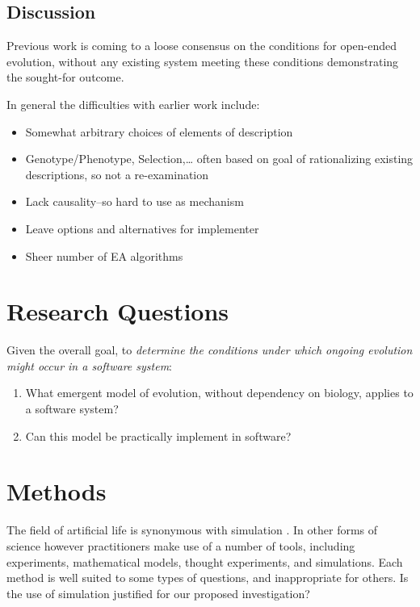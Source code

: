 \subsection{Discussion}

Previous work is coming to a loose consensus on the conditions for open-ended evolution, without any existing system meeting these conditions demonstrating the sought-for outcome.

In general the difficulties with earlier work include:
\begin{itemize}
	\item Somewhat arbitrary choices of elements of description
	\item Genotype/Phenotype, Selection,\ldots{} often based on goal of rationalizing existing descriptions, so not a re-examination
	\item Lack causality--so hard to use as mechanism
	\item Leave options and alternatives for implementer
	\item Sheer number of EA algorithms
\end{itemize}


\section{Research Questions}

Given the overall goal, to \emph{determine the conditions under which ongoing evolution might occur in a software system}:

\vspace{0.3cm}
\begin{minipage}[l]{0.95\textwidth}
	\begin{enumerate}[label=RQ\arabic*:]
		\item What emergent model of evolution, without dependency on biology, applies to a software system?
		\item Can this model be practically implement in software?
	\end{enumerate}
\end{minipage}
\vspace{0.3cm}

\section{Methods}

The field of artificial life is synonymous with simulation \autocite[chap.2]{Aicardi2010}. In other forms of science however practitioners make use of a number of tools, including experiments, mathematical models, thought experiments, and simulations. Each method is well suited to some types of questions, and inappropriate for others. Is the use of simulation justified for our proposed investigation?

